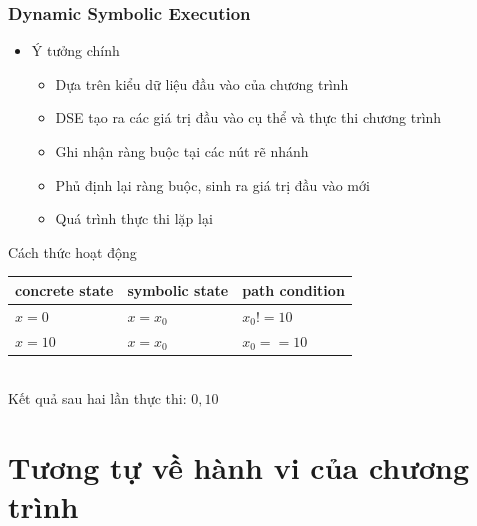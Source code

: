 \documentclass{beamer}
\begin{document}
\begin{frame}
  \frametitle{Dynamic Symbolic Execution}
  \begin{itemize}
  \item Ý tưởng chính
    \begin{itemize}
    \item Dựa trên kiểu dữ liệu đầu vào của chương trình
    \item DSE tạo ra các giá trị đầu vào cụ thể và thực thi chương trình 
    \item Ghi nhận ràng buộc tại các nút rẽ nhánh
    \item Phủ định lại ràng buộc, sinh ra giá trị đầu vào mới
    \item Quá trình thực thi lặp lại
    \end{itemize}
  \end{itemize} \pause
	
  \begin{block}{Cách thức hoạt động}
    \begin{minipage}[T]{0.40\linewidth}
      
    \end{minipage}
    \hfill    
    \begin{minipage}[T]{0.55\linewidth}
		{\footnotesize\centering
		\begin{tabular}{  m{4em} | m{4em} | m{4em}  }
		concrete state & symbolic state & path condition \\ 
		\hline
		$ x = 0 $ & $ x = x_{0} $ & $ x_{0} != 10 $ \\  
		\hline
		$ x = 10 $ & $ x = x_{0} $ & $ x_{0} == 10 $ \\ 		
		\end{tabular}
		\\ \pause
		Kết quả sau hai lần thực thi: $ 0, 10 $ 
		}
    \end{minipage}
  \end{block}
	
\end{frame}

\section{Tương tự về hành vi của chương trình}
\end{document}

